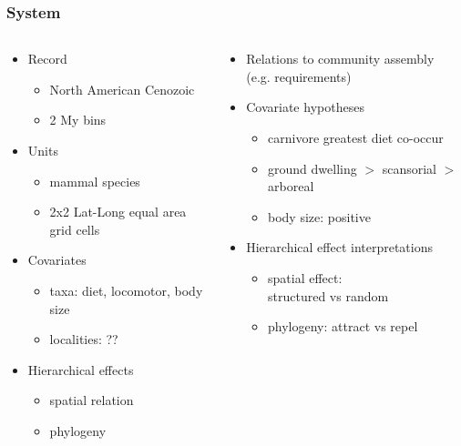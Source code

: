 \documentclass{beamer}
\begin{document}
\begin{frame}
  \frametitle{System}
  \begin{columns}
    \begin{column}{0.5\textwidth}
      \begin{itemize}
        \item Record
          \begin{itemize}
            \item North American Cenozoic
            \item 2 My bins
          \end{itemize}
        \item Units
          \begin{itemize}
            \item mammal species 
            \item 2x2 Lat-Long equal area grid cells
          \end{itemize}
        \item Covariates
          \begin{itemize}
            \item taxa: diet, locomotor, body size
            \item localities: ??
          \end{itemize}
        \item Hierarchical effects
          \begin{itemize}
            \item spatial relation
            \item phylogeny
          \end{itemize}
      \end{itemize}
    \end{column}
    \begin{column}{0.5\textwidth}
      \begin{itemize}
        \item Relations to community assembly \\(e.g. requirements)
        \item Covariate hypotheses
          \begin{itemize}
            \item carnivore greatest diet co-occur
            \item ground dwelling \(>\) scansorial \(>\) arboreal
            \item body size: positive
          \end{itemize}
        \item Hierarchical effect interpretations
          \begin{itemize}
            \item spatial effect: \\structured vs random
            \item phylogeny: attract vs repel
          \end{itemize}
      \end{itemize}
    \end{column}
  \end{columns}
\end{frame}
\end{document}
